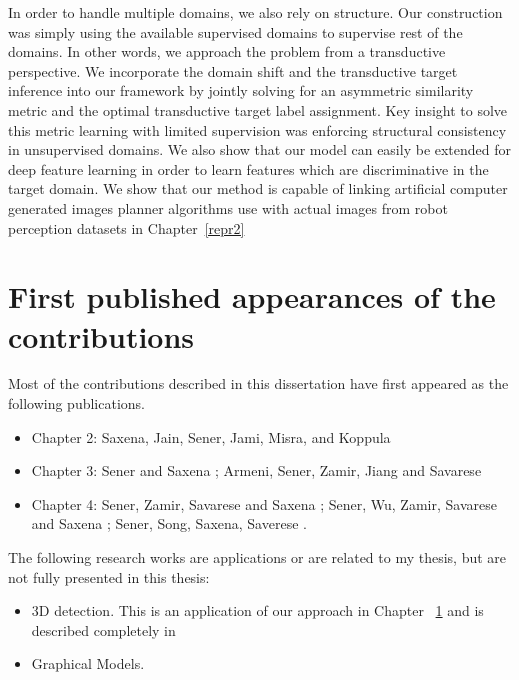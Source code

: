 In order to handle multiple domains, we also rely on structure. Our construction was simply using the available supervised domains to supervise rest of the domains. In other words, we approach the problem from a transductive perspective. We incorporate the domain shift and the transductive target inference into our framework by jointly solving for an asymmetric similarity metric and the optimal transductive target label assignment. Key insight to solve this metric learning with limited supervision was enforcing structural consistency in unsupervised domains. We also show that our model can easily be extended for deep feature learning in order to learn features which are discriminative in the target domain. We show that our method is capable of linking artificial computer generated images planner algorithms use with actual images from robot perception datasets in Chapter~\ref{repr2}

\section{First published appearances of the contributions}

Most of the contributions described in this dissertation have first appeared as the following publications.
\begin{itemize}
\item Chapter 2: Saxena, Jain, Sener, Jami, Misra, and Koppula \cite{robobrain}
\item Chapter 3: Sener and Saxena \cite{rcrf}; Armeni, Sener, Zamir, Jiang and Savarese \cite{cvpr_iro}
\item Chapter 4: Sener, Zamir, Savarese and Saxena \cite{iccv_ozan}; Sener, Wu, Zamir, Savarese and Saxena \cite{ijcv_ozan}; Sener, Song, Saxena, Saverese \cite{da_ozan}.
\end{itemize}

The following research works are applications or are related to my thesis, but are not fully presented in this thesis:
\begin{itemize}
\item {3D detection.}  This is an application of our approach in Chapter ~\ref{} and is described completely in \cite{xx}
\item {Graphical Models.} 
\end{itemize}
